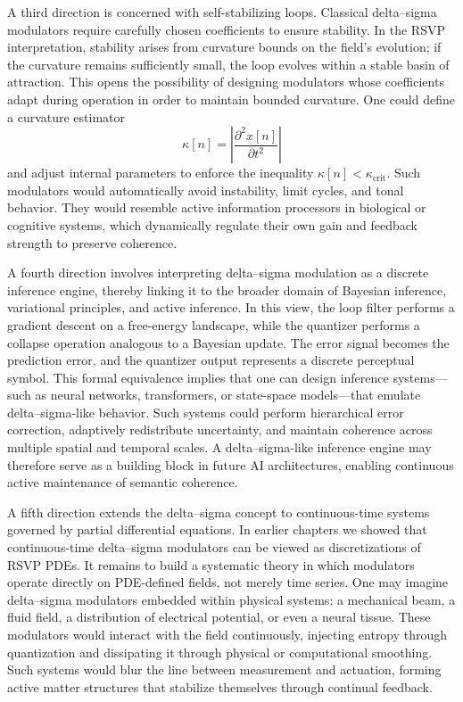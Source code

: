 A third direction is concerned with self-stabilizing loops. Classical delta–sigma modulators require carefully chosen coefficients to ensure stability. In the RSVP interpretation, stability arises from curvature bounds on the field’s evolution; if the curvature remains sufficiently small, the loop evolves within a stable basin of attraction. This opens the possibility of designing modulators whose coefficients adapt during operation in order to maintain bounded curvature. One could define a curvature estimator
\[
\kappa[n] = \left| \frac{\partial^{2} x[n]}{\partial t^{2}} \right|
\]
and adjust internal parameters to enforce the inequality \(\kappa[n] < \kappa_{\mathrm{crit}}\). Such modulators would automatically avoid instability, limit cycles, and tonal behavior. They would resemble active information processors in biological or cognitive systems, which dynamically regulate their own gain and feedback strength to preserve coherence.

A fourth direction involves interpreting delta–sigma modulation as a discrete inference engine, thereby linking it to the broader domain of Bayesian inference, variational principles, and active inference. In this view, the loop filter performs a gradient descent on a free-energy landscape, while the quantizer performs a collapse operation analogous to a Bayesian update. The error signal becomes the prediction error, and the quantizer output represents a discrete perceptual symbol. This formal equivalence implies that one can design inference systems—such as neural networks, transformers, or state-space models—that emulate delta–sigma-like behavior. Such systems could perform hierarchical error correction, adaptively redistribute uncertainty, and maintain coherence across multiple spatial and temporal scales. A delta–sigma-like inference engine may therefore serve as a building block in future AI architectures, enabling continuous active maintenance of semantic coherence.

A fifth direction extends the delta–sigma concept to continuous-time systems governed by partial differential equations. In earlier chapters we showed that continuous-time delta–sigma modulators can be viewed as discretizations of RSVP PDEs. It remains to build a systematic theory in which modulators operate directly on PDE-defined fields, not merely time series. One may imagine delta–sigma modulators embedded within physical systems: a mechanical beam, a fluid field, a distribution of electrical potential, or even a neural tissue. These modulators would interact with the field continuously, injecting entropy through quantization and dissipating it through physical or computational smoothing. Such systems would blur the line between measurement and actuation, forming active matter structures that stabilize themselves through continual feedback.

